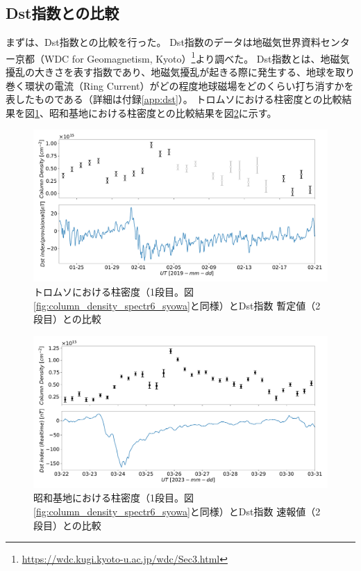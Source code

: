 \subsection{Dst指数との比較}
\label{ssec:comparison_dst}
まずは、Dst指数との比較を行った。
Dst指数のデータは地磁気世界資料センター京都（WDC for Geomagnetism, Kyoto）\footnote{\url{https://wdc.kugi.kyoto-u.ac.jp/wdc/Sec3.html}}より調べた。
Dst指数とは、地磁気擾乱の大きさを表す指数であり、地磁気擾乱が起きる際に発生する、地球を取り巻く環状の電流（Ring Current）がどの程度地球磁場をどのくらい打ち消すかを表したものである（詳細は付録\ref{app:dst}）。
トロムソにおける柱密度との比較結果を図\ref{fig:dst_mmcd_tromsoe}、昭和基地における柱密度との比較結果を図\ref{fig:dst_mmcd_syowa}に示す。
\begin{figure}[htbp]
    \centering
    \includegraphics[width=\linewidth]{master_thesis_contents/master_thesis_fig/dst_tromsoe_mmcd.pdf}
    \caption{トロムソにおける柱密度（1段目。図\ref{fig:column_density_spectr6_syowa}と同様）とDst指数 暫定値（2段目）との比較}
    \label{fig:dst_mmcd_tromsoe}
\end{figure}
\begin{figure}[htbp]
    \centering
    \includegraphics[width=\linewidth]{master_thesis_contents/master_thesis_fig/column_density_spectr6_dst_syowa.pdf}
    \caption{昭和基地における柱密度（1段目。図\ref{fig:column_density_spectr6_syowa}と同様）とDst指数 速報値（2段目）との比較}
    \label{fig:dst_mmcd_syowa}
\end{figure}
